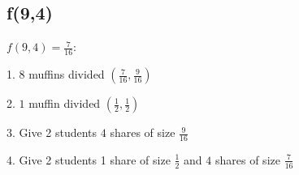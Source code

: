 \documentclass[a4paper]{article}
\begin{document}
\subsection{f(9,4)}
\hspace{4ex}
$f(9,4) = \frac{7}{16}$:

\noindent
\hspace{4ex}
1. $8$ muffins divided $(\frac{7}{16},\frac{9}{16})$

\noindent
\hspace{4ex}
2. $1$ muffin divided $(\frac{1}{2},\frac{1}{2})$

\noindent
\hspace{4ex}
3. Give 2 students $4$ shares of size $\frac{9}{16}$

\noindent
\hspace{4ex}
4. Give 2 students 1 share of size $\frac{1}{2}$ and $4$ shares of size $\frac{7}{16}$
\end{document}
